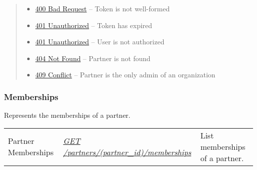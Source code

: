 \documentclass[letterpaper,10pt,english]{sphinxmanual}
\begin{document}
\begin{fulllineitems}
\begin{quote}
\begin{description}
\begin{itemize}
\item {} 
\href{http://www.w3.org/Protocols/rfc2616/rfc2616-sec10.html\#sec10.4.1}{400 Bad Request} -- Token is not well-formed

\item {} 
\href{http://www.w3.org/Protocols/rfc2616/rfc2616-sec10.html\#sec10.4.2}{401 Unauthorized} -- Token has expired

\item {} 
\href{http://www.w3.org/Protocols/rfc2616/rfc2616-sec10.html\#sec10.4.2}{401 Unauthorized} -- User is not authorized

\item {} 
\href{http://www.w3.org/Protocols/rfc2616/rfc2616-sec10.html\#sec10.4.5}{404 Not Found} -- Partner is not found

\item {} 
\href{http://www.w3.org/Protocols/rfc2616/rfc2616-sec10.html\#sec10.4.10}{409 Conflict} -- Partner is the only admin of an organization

\end{itemize}

\end{description}\end{quote}

\end{fulllineitems}



\subsubsection{Memberships}
\label{\detokenize{resources/partner:memberships}}
Represents the memberships of a partner.

\noindent\begin{tabulary}{\linewidth}{|L|L|L|}
\hline
{}\relax &\relax &\relax \\
\hline
Partner Memberships
&
{\hyperref[\detokenize{resources/partner:get--partners-(partner_id)-memberships}]{\emph{GET /partners/(partner\_id)/memberships}}}
&
List memberships of a partner.
\\
\hline\end{tabulary}


\begin{DUlineblock}{0em}
\item[] 
\end{DUlineblock}
\end{document}
